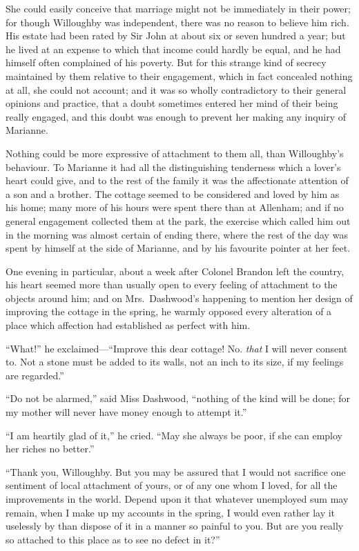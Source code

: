\documentclass{article}
\begin{document}
She could easily conceive that marriage might not
be immediately in their power; for though Willoughby
was independent, there was no reason to believe him rich.
His estate had been rated by Sir John at about six or seven
hundred a year; but he lived at an expense to which that income
could hardly be equal, and he had himself often complained
of his poverty.  But for this strange kind of secrecy
maintained by them relative to their engagement, which
in fact concealed nothing at all, she could not account;
and it was so wholly contradictory to their general
opinions and practice, that a doubt sometimes entered
her mind of their being really engaged, and this doubt
was enough to prevent her making any inquiry of Marianne.

Nothing could be more expressive of attachment
to them all, than Willoughby's behaviour.  To Marianne
it had all the distinguishing tenderness which a lover's
heart could give, and to the rest of the family it was the
affectionate attention of a son and a brother.  The cottage
seemed to be considered and loved by him as his home;
many more of his hours were spent there than at Allenham;
and if no general engagement collected them at the park,
the exercise which called him out in the morning was
almost certain of ending there, where the rest of the day
was spent by himself at the side of Marianne, and by his
favourite pointer at her feet.

One evening in particular, about a week after
Colonel Brandon left the country, his heart seemed
more than usually open to every feeling of attachment
to the objects around him; and on Mrs.\ Dashwood's
happening to mention her design of improving the cottage
in the spring, he warmly opposed every alteration
of a place which affection had established as perfect with him.

``What!'' he exclaimed---``Improve this dear cottage!
No. \emph{that} I will never consent to.  Not a stone must
be added to its walls, not an inch to its size,
if my feelings are regarded.''

``Do not be alarmed,'' said Miss Dashwood,
``nothing of the kind will be done; for my mother
will never have money enough to attempt it.''

``I am heartily glad of it,'' he cried.  ``May she
always be poor, if she can employ her riches no better.''

``Thank you, Willoughby.  But you may be assured that I
would not sacrifice one sentiment of local attachment
of yours, or of any one whom I loved, for all the improvements
in the world.  Depend upon it that whatever unemployed
sum may remain, when I make up my accounts in the spring,
I would even rather lay it uselessly by than dispose
of it in a manner so painful to you.  But are you really
so attached to this place as to see no defect in it?''
\end{document}
